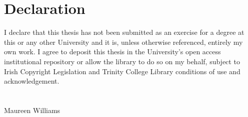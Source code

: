 \chapter*{Declaration}

I declare that this thesis has not been submitted as an exercise for a degree at this or any other University and it is, unless otherwise referenced, entirely my own work. I agree to deposit this thesis in the University's open access institutional repository or allow the library to do so on my behalf, subject to Irish Copyright Legislation and Trinity College Library conditions of use and acknowledgement.
\\
\\
\\

Maureen Williams